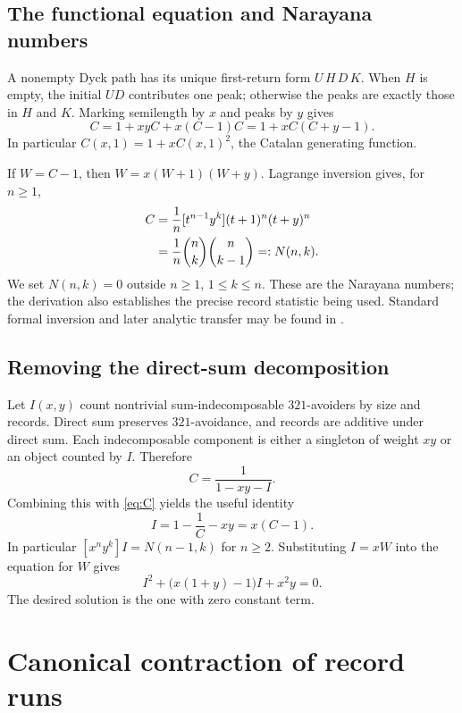 \documentclass[11pt,a4paper]{article}
\theoremstyle{definition}
\theoremstyle{remark}
\begin{document}
\subsection{The functional equation and Narayana numbers}

A nonempty Dyck path has its unique first-return form $U\,H\,D\,K$.
When $H$ is empty, the initial $UD$ contributes one peak; otherwise the
peaks are exactly those in $H$ and $K$. Marking semilength by $x$ and
peaks by $y$ gives
\begin{equation}\label{eq:C}
 C=1+xyC+x(C-1)C
   =1+xC(C+y-1).
\end{equation}
In particular $C(x,1)=1+xC(x,1)^2$, the Catalan generating function.

If $W=C-1$, then $W=x(W+1)(W+y)$. Lagrange inversion gives, for $n\geq1$,
\begin{align}
 [x^ny^k]C
 &=\frac1n[t^{n-1}y^k](t+1)^n(t+y)^n\notag\\
 &=\frac1n\binom nk\binom n{k-1}
 =:N(n,k).\label{eq:Narayana}
\end{align}
We set $N(n,k)=0$ outside $n\geq1$, $1\leq k\leq n$.
These are the Narayana numbers; the derivation also establishes the precise
record statistic being used. Standard formal inversion and later analytic
transfer may be found in \cite{flajolet-sedgewick}.

\subsection{Removing the direct-sum decomposition}

Let $I(x,y)$ count nontrivial sum-indecomposable $321$-avoiders by size and
records. Direct sum preserves $321$-avoidance, and records are additive
under direct sum. Each indecomposable component is either a singleton of
weight $xy$ or an object counted by $I$. Therefore
\[
 C=\frac{1}{1-xy-I}.
\]
Combining this with \eqref{eq:C} yields the useful identity
\begin{equation}\label{eq:I}
 I=1-\frac1C-xy=x(C-1).
\end{equation}
In particular $[x^ny^k]I=N(n-1,k)$ for $n\geq2$. Substituting $I=xW$
into the equation for $W$ gives
\begin{equation}\label{eq:Iquad}
 I^2+\bigl(x(1+y)-1\bigr)I+x^2y=0.
\end{equation}
The desired solution is the one with zero constant term.

\section{Canonical contraction of record runs}
\end{document}
